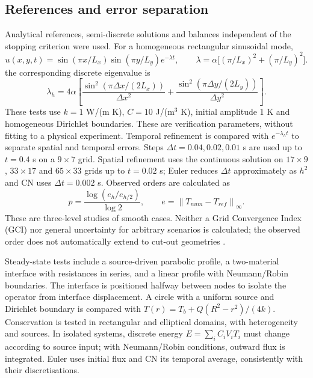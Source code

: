 \documentclass[11pt,a4paper]{article}
\newcommand{\norm}[1]{\left\lVert#1\right\rVert}
\newcommand{\dt}{\Delta t}
\begin{document}
\subsection{References and error separation}
Analytical references, semi-discrete solutions and balances independent of the stopping criterion were used. For a homogeneous rectangular sinusoidal mode,
\begin{equation}
 u(x,y,t)=\sin(\pi x/L_x)\sin(\pi y/L_y)e^{-\lambda t},\qquad
 \lambda=\alpha\big[(\pi/L_x)^2+(\pi/L_y)^2\big].
\end{equation}
the corresponding discrete eigenvalue is
\begin{equation}
 \lambda_h=4\alpha\left[\frac{\sin^2(\pi\Delta x/(2L_x))}{\Delta x^2}+\frac{\sin^2(\pi\Delta y/(2L_y))}{\Delta y^2}\right].
\end{equation}
These tests use $k=1$ W/(m K), $C=10$ J/(m$^3$ K), initial amplitude 1 K and homogeneous Dirichlet boundaries. These are verification parameters, without fitting to a physical experiment. Temporal refinement is compared with $e^{-\lambda_ht}$ to separate spatial and temporal errors. Steps $\dt=0.04,0.02,0.01$ s are used up to $t=0.4$ s on a $9\times7$ grid. Spatial refinement uses the continuous solution on $17\times9$, $33\times17$ and $65\times33$ grids up to $t=0.02$ s; Euler reduces $\dt$ approximately as $h^2$ and CN uses $\dt=0.002$ s. Observed orders are calculated as
\begin{equation}
 p=\frac{\log(e_h/e_{h/2})}{\log2},\qquad e=\norm{T_{num}-T_{ref}}_\infty.
 \label{eq:order}
\end{equation}
These are three-level studies of smooth cases. Neither a Grid Convergence Index (GCI) nor general uncertainty for arbitrary scenarios is calculated; the observed order does not automatically extend to cut-out geometries \cite{nasa-grid}.

Steady-state tests include a source-driven parabolic profile, a two-material interface with resistances in series, and a linear profile with Neumann/Robin boundaries. The interface is positioned halfway between nodes to isolate the operator from interface displacement. A circle with a uniform source and Dirichlet boundary is compared with $T(r)=T_b+Q(R^2-r^2)/(4k)$. Conservation is tested in rectangular and elliptical domains, with heterogeneity and sources. In isolated systems, discrete energy $E=\sum_iC_iV_iT_i$ must change according to source input; with Neumann/Robin conditions, outward flux is integrated. Euler uses initial flux and CN its temporal average, consistently with their discretisations.
\end{document}
